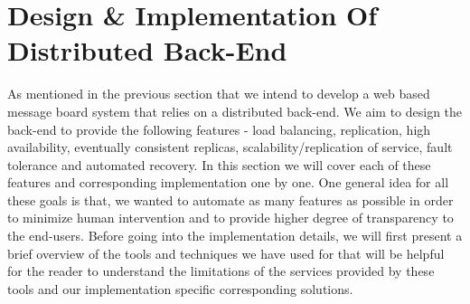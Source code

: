 \documentclass[12pt]{article}
\begin{document}
\section {Design \& Implementation Of Distributed Back-End}
As mentioned in the previous section that we intend to develop a web based message board system that relies on a distributed back-end. We aim to design the back-end to provide the following features - load balancing, replication, high availability, eventually consistent replicas, scalability/replication of service, fault tolerance and automated recovery. In this section we will cover each of these features and corresponding implementation one by one. One general idea for all these goals is that, we wanted to automate as many features as possible in order to minimize human intervention and to provide higher degree of transparency to the end-users. Before going into the implementation details, we will first present a brief overview of the tools and techniques we have used for that will be helpful for the reader to understand the limitations of the services provided by these tools and our implementation specific corresponding solutions.
\end{document}
